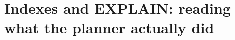 \chapter{Indexes and EXPLAIN: reading what the planner actually did}
\label{ch:indexes-and-explain-reading-what-the}

